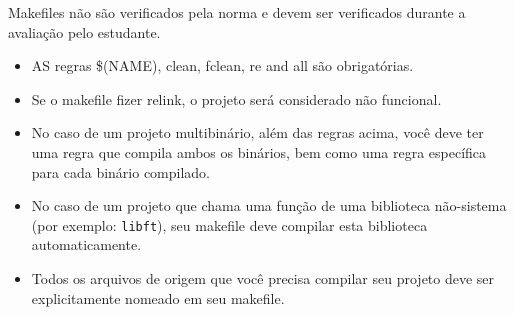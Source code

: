 \documentclass{42-pt}
\begin{document}
            Makefiles não são verificados pela norma e devem ser verificados durante a avaliação pelo estudante.
            \begin{itemize}

                \item AS regras \$(NAME), clean, fclean, re and all
                  são obrigatórias.

                \item Se o makefile fizer relink, o projeto será considerado
                  não funcional.

                \item No caso de um projeto multibinário, além das
                  regras acima, você deve ter uma regra que compila
                  ambos os binários, bem como uma regra específica para cada
                  binário compilado.

                \item No caso de um projeto que chama uma função de uma biblioteca não-sistema
                  (por exemplo: \texttt{libft}), seu makefile deve compilar
                  esta biblioteca automaticamente.

                \item Todos os arquivos de origem que você precisa compilar seu projeto deve
                    ser explicitamente nomeado em seu makefile.

            \end{itemize}
\end{document}
